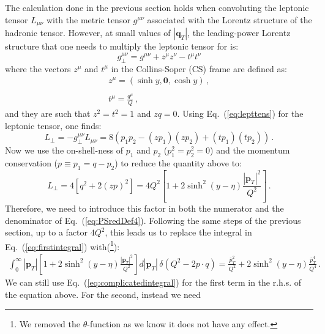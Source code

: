 \documentclass[10pt,a4paper]{article}
\begin{document}
The calculation done in the previous section holds when convoluting
the leptonic tensor $L_{\mu\nu}$ with the metric tensor $g^{\mu\nu}$
associated with the Lorentz structure of the hadronic tensor. However,
at small values of $|\mathbf{q}_T|$, the leading-power Lorentz
structure that one needs to multiply the leptonic tensor for is:
\begin{equation}
g_\perp^{\mu\nu} = g^{\mu\nu}+z^\mu z^\nu-t^\mu t^\nu
\end{equation}
where the vectors $z^\mu$ and $t^\mu$ in the Collins-Soper (CS) frame
are defined as:
\begin{equation}
\begin{array}{l}
\displaystyle z^\mu = (\sinh y,\mathbf{0},\cosh y)\,,\\
\\
\displaystyle t^\mu = \frac{q^\mu}{Q}\,,
\end{array}
\end{equation}
and they are such that $z^2=t^2=1$ and $zq = 0$. Using
Eq.~(\ref{eq:lepttens}) for the leptonic tensor, one finds:
\begin{equation}
L_\perp = -g_\perp^{\mu\nu}L_{\mu\nu} = 8(p_1p_2 - (zp_1) (zp_2) + (tp_1) (tp_2))\,.
\end{equation}
Now we use the on-shell-ness of $p_1$ and $p_2$ ($p_1^2=p_2^2=0$) and
the momentum conservation ($p\equiv p_1=q-p_2$) to reduce the quantity
above to:
\begin{equation}\label{eq:LT}
  L_\perp = 4\left[q^2 + 2(zp)^2\right] = 4Q^2\left[1+2 \sinh^2(y-\eta)\frac{|\mathbf{p}_T|^2}{Q^2}\right]\,.
\end{equation}
Therefore, we need to introduce this factor in both the numerator and
the denominator of Eq.~(\ref{eq:PSredDef4}). Following the same steps
of the previous section, up to a factor $4Q^2$, this leads us to
replace the integral in Eq.~(\ref{eq:firstintegral}) with(\footnote{We
  removed the $\theta$-function as we know it does not have any
  effect.}):
\begin{equation}\label{eq:firstintegralNew}
\begin{array}{l}
  \displaystyle \int_0^\infty|\mathbf{p}_T|\left[1+2 \sinh^2(y-\eta)
  \frac{|\mathbf{p}_T|^2}{Q^2}\right]d|\mathbf{p}_T|\,\delta(Q^2-2p\cdot
  q) =\frac{\overline{p}_T^2}{Q^2}+
  2\sinh^2(y-\eta)\frac{\overline{p}_T^4} {Q^4}
  \,.
\end{array}
\end{equation}
We can still use Eq.~(\ref{eq:complicatedintegral}) for the first term
in the r.h.s. of the equation above. For the second, instead we need
\end{document}
